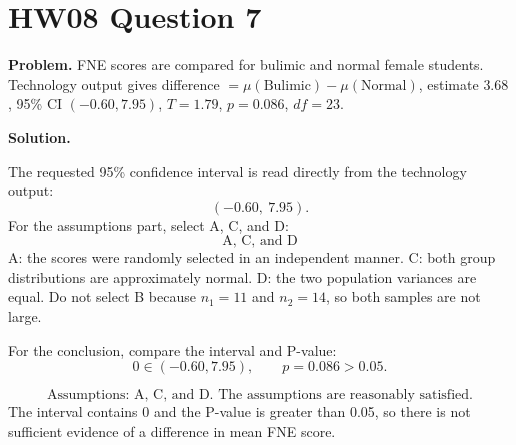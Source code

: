 \documentclass[11pt]{article}
\begin{document}
\section*{HW08 Question 7}

\textbf{Problem.} FNE scores are compared for bulimic and normal female students. Technology output gives difference \(=\mu(\text{Bulimic})-\mu(\text{Normal})\), estimate \(3.68\), 95\% CI \((-0.60,7.95)\), \(T=1.79\), \(p=0.086\), \(df=23\).

\textbf{Solution.}

The requested 95\% confidence interval is read directly from the technology output:
\[
\boxed{(-0.60,\ 7.95)}.
\]
For the assumptions part, select A, C, and D:
\[
\boxed{\text{A, C, and D}}
\]
A: the scores were randomly selected in an independent manner. C: both group distributions are approximately normal. D: the two population variances are equal. Do not select B because \(n_1=11\) and \(n_2=14\), so both samples are not large.

For the conclusion, compare the interval and P-value:
\[
0\in(-0.60,7.95),\qquad p=0.086>0.05.
\]

\[
\boxed{\text{Assumptions: A, C, and D. The assumptions are reasonably satisfied.}}
\]
The interval contains 0 and the P-value is greater than 0.05, so there is not sufficient evidence of a difference in mean FNE score.
\end{document}
